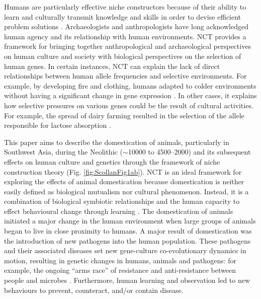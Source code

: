 	Humans are particularly effective niche constructors because of their ability to learn and culturally transmit knowledge and skills in order to devise efficient problem solutions \parencite{Richerson_2005}. 
Archaeologists and anthropologists have long acknowledged human agency and its relationship with human environments. NCT provides a framework for bringing together anthropological and archaeological perspectives on human culture and society with biological perspectives on the selection of human genes. In certain instances, NCT can explain the lack of direct relationships between human allele frequencies and selective environments. For example, by developing fire and clothing, humans adapted to colder environments without having a significant change in gene expression \parencite[140--141]{Laland_2010b}. 
In other cases, it explains how selective pressures on various genes could be the result of cultural activities. For example, the spread of dairy farming resulted in the selection of the allele responsible for lactose absorption \parencites[3738]{Burger_2007}{Feldman_1989}{Holden_1997}.

This paper aims to describe the domestication of animals, particularly in Southwest Asia, during the Neolithic ($\sim$10000 to 4500--2000\BC) 
and its subsequent effects on human culture and genetics through the framework of niche construction theory (Fig. \ref{fig:ScollanFig1ab}). 
NCT is an ideal framework for exploring the effects of animal domestication because domestication is neither easily defined as biological mutualism nor cultural phenomenon. 
Instead, it is a combination of biological symbiotic relationships 
and the human capacity to effect behavioural change through learning \parencite[111--115]{Zeder_2006a}. 
The domestication of animals initiated a major change in the human environment when large groups of animals began to live in close proximity to humans. A major result of domestication was the introduction of new pathogens into the human population. These pathogens and their associated diseases set new gene-culture co-evolutionary dynamics in motion, resulting in genetic changes in humans, animals and pathogens: for example, the ongoing “arms race” of resistance and anti-resistance between people and microbes \parencite{Boni_2005}. 
Furthermore, human learning and observation led to new behaviours to prevent, counteract, and/or contain disease.

